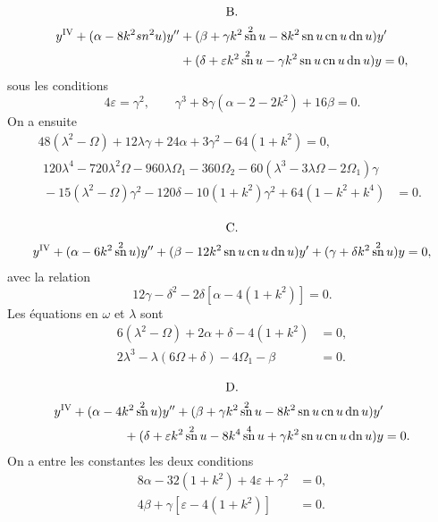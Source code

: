 \documentclass[11pt,leqno,oneside,letterpaper]{book}[2005/09/16]
\DeclareMathOperator{\sn}{sn}
\DeclareMathOperator{\cn}{cn}
\DeclareMathOperator{\dn}{dn}
\begin{document}
\begin{gather*}
\text{B.} \\
\begin{split}
y^{\textsc{IV}}+(\alpha-8 k^2 sn^2 u)y''
   &+ (\beta  + \gamma      k^2 \sn^2 u - 8      k^2 \sn u \cn u \dn u)y'  \\
   &+ (\delta + \varepsilon k^2 \sn^2 u - \gamma k^2 \sn u \cn u \dn u)y  = 0,
\end{split}
\end{gather*}
sous les conditions
\[
4\varepsilon=\gamma^2, \qquad \gamma^3+8\gamma(\alpha-2-2k^2)+16\beta = 0.
\]
On a ensuite
\begin{gather*}
48(\lambda^2-\Omega)+12\lambda\gamma+24\alpha+3\gamma^2-64(1+k^2)=0, \\
\begin{split}
120\lambda^4 - 720\lambda^2\Omega - 960\lambda\Omega_1 - 360\Omega_2
       - 60(\lambda^3 - 3\lambda\Omega - 2\Omega_1) \gamma \\
  {} -15(\lambda^2-\Omega)\gamma^2-120\delta-10(1+k^2)\gamma^2+64(1-k^2+k^4)&=0.
\end{split}
\end{gather*}

\begin{gather*}
\text{C.} \\
y^{\textsc{IV}} + (\alpha-6k^2 \sn^2 u) y''+(\beta-12 k^2 \sn u \cn u \dn u)y'+(\gamma+\delta k^2 \sn^2 u)y = 0,
\end{gather*}
avec la relation
\[
12\gamma-\delta^2-2\delta [ \alpha-4(1+k^2) ] = 0.
\]
Les \'equations en $\omega$ et $\lambda$ sont
\begin{align*}
6(\lambda^2-\Omega) + 2\alpha + \delta - 4(1+k^2)        &=0, \\
2\lambda^3 - \lambda(6\Omega+\delta) - 4\Omega_1 - \beta &=0.
\end{align*}

\begin{gather*}
\text{D.} \\
\begin{split}
  y^{\textsc{IV}} + (\alpha - 4k^2 \sn^2 u)y'' +
    (\beta + \gamma k^2 \sn^2 u - 8k^2 \sn u \cn u \dn u) y' &\\
{} + (\delta + \varepsilon k^2 \sn^2 u - 8k^4 \sn ^4 u +
    \gamma k^2 \sn u \cn u \dn u) y &= 0.
\end{split}
\end{gather*}
On a entre les constantes les deux conditions
\begin{align*}
8\alpha - 32(1 + k^2) + 4\varepsilon + \gamma ^2 &= 0, \\
4\beta + \gamma \left[ \varepsilon - 4(1 + k^2 ) \right] &= 0.
\end{align*}
\end{document}
